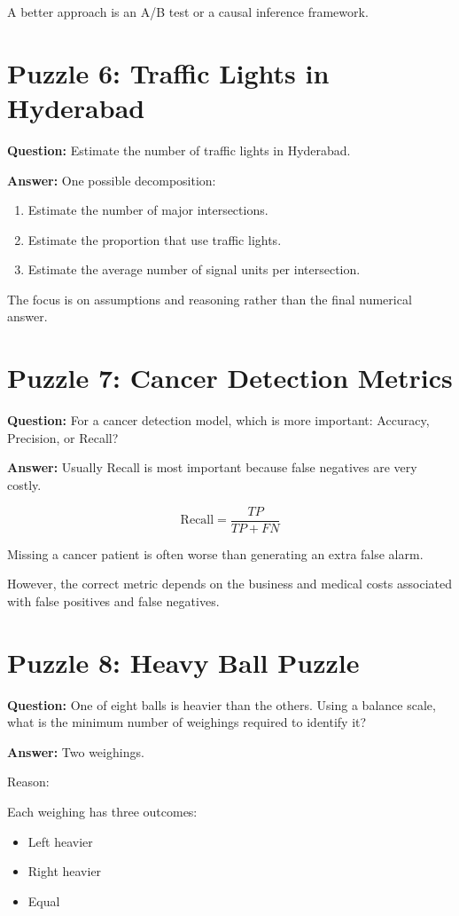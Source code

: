 \documentclass{article}
\begin{document}
A better approach is an A/B test or a causal inference framework.

\section*{Puzzle 6: Traffic Lights in Hyderabad}

\textbf{Question:}
Estimate the number of traffic lights in Hyderabad.

\textbf{Answer:}
One possible decomposition:
\begin{enumerate}
    \item Estimate the number of major intersections.
    \item Estimate the proportion that use traffic lights.
    \item Estimate the average number of signal units per intersection.
\end{enumerate}

The focus is on assumptions and reasoning rather than the final numerical answer.

\section*{Puzzle 7: Cancer Detection Metrics}

\textbf{Question:}
For a cancer detection model, which is more important: Accuracy, Precision, or Recall?

\textbf{Answer:}
Usually Recall is most important because false negatives are very costly.

\[
\text{Recall}=\frac{TP}{TP+FN}
\]

Missing a cancer patient is often worse than generating an extra false alarm.

However, the correct metric depends on the business and medical costs associated with false positives and false negatives.

\section*{Puzzle 8: Heavy Ball Puzzle}

\textbf{Question:}
One of eight balls is heavier than the others.
Using a balance scale, what is the minimum number of weighings required to identify it?

\textbf{Answer:}
Two weighings.

Reason:

Each weighing has three outcomes:
\begin{itemize}
    \item Left heavier
    \item Right heavier
    \item Equal
\end{itemize}
\end{document}
